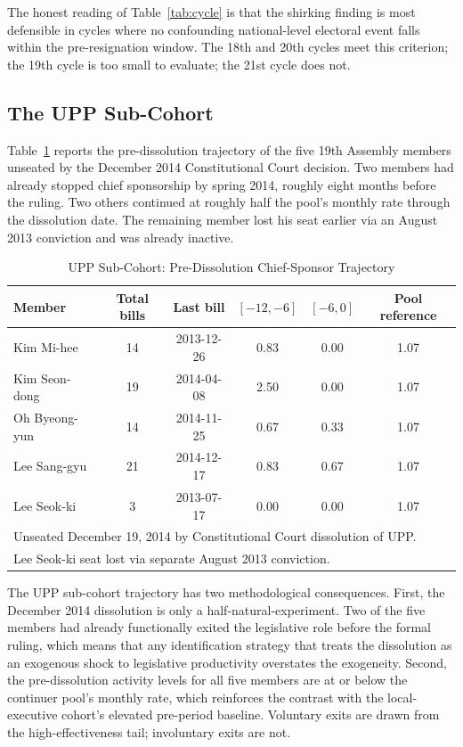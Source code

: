 \documentclass[11pt]{article}
\begin{document}
The honest reading of Table~\ref{tab:cycle} is that the shirking finding is most defensible in cycles where no confounding national-level electoral event falls within the pre-resignation window. The 18th and 20th cycles meet this criterion; the 19th cycle is too small to evaluate; the 21st cycle does not.

\subsection{The UPP Sub-Cohort}

Table~\ref{tab:upp} reports the pre-dissolution trajectory of the five 19th Assembly members unseated by the December 2014 Constitutional Court decision. Two members had already stopped chief sponsorship by spring 2014, roughly eight months before the ruling. Two others continued at roughly half the pool's monthly rate through the dissolution date. The remaining member lost his seat earlier via an August 2013 conviction and was already inactive.

\begin{table}[H]
\centering
\caption{UPP Sub-Cohort: Pre-Dissolution Chief-Sponsor Trajectory}
\label{tab:upp}
\begin{tabular}{lccccc}
\toprule
Member & Total bills & Last bill & $[-12, -6]$ & $[-6, 0]$ & Pool reference \\
\midrule
Kim Mi-hee & 14 & 2013-12-26 & 0.83 & 0.00 & 1.07 \\
Kim Seon-dong & 19 & 2014-04-08 & 2.50 & 0.00 & 1.07 \\
Oh Byeong-yun & 14 & 2014-11-25 & 0.67 & 0.33 & 1.07 \\
Lee Sang-gyu & 21 & 2014-12-17 & 0.83 & 0.67 & 1.07 \\
Lee Seok-ki & 3 & 2013-07-17 & 0.00 & 0.00 & 1.07 \\
\bottomrule
\multicolumn{6}{l}{\footnotesize Unseated December 19, 2014 by Constitutional Court dissolution of UPP.} \\
\multicolumn{6}{l}{\footnotesize Lee Seok-ki seat lost via separate August 2013 conviction.}
\end{tabular}
\end{table}

The UPP sub-cohort trajectory has two methodological consequences. First, the December 2014 dissolution is only a half-natural-experiment. Two of the five members had already functionally exited the legislative role before the formal ruling, which means that any identification strategy that treats the dissolution as an exogenous shock to legislative productivity overstates the exogeneity. Second, the pre-dissolution activity levels for all five members are at or below the continuer pool's monthly rate, which reinforces the contrast with the local-executive cohort's elevated pre-period baseline. Voluntary exits are drawn from the high-effectiveness tail; involuntary exits are not.
\end{document}
